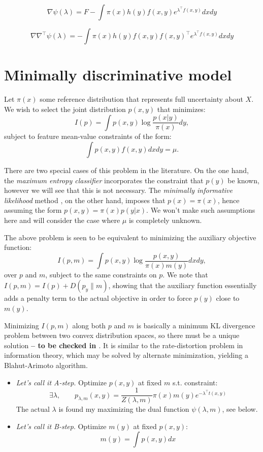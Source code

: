 \documentclass[english]{scrartcl}
\begin{document}
$$
\nabla\psi(\lambda)
= F - \int \pi(x) h(y) f(x,y) e^{\lambda^\top f(x,y)} dx dy
$$

$$
\nabla\nabla^\top\psi(\lambda)
= - \int \pi(x) h(y) f(x,y)f(x,y)^\top e^{\lambda^\top f(x,y)} dx dy
$$


\section{Minimally discriminative model}

Let $\pi(x)$ some reference distribution that represents full
uncertainty about $X$. We wish to select the joint distribution
$p(x,y)$ that minimizes:
$$
I(p) = \int p(x,y) \log \frac{p(x|y)}{\pi(x)} dy,
$$ subject to feature mean-value constraints of the form:
$$
\int p(x,y) f(x,y) dx dy = \mu.
$$

There are two special cases of this problem in the literature.  On the
one hand, the {\em maximum entropy classifier} \cite{BergerA-96}
incorporates the constraint that $p(y)$ be known, however we will see
that this is not necessary. The {\em minimally informative likelihood}
method \cite{Yuan-99b,Yuan-99}, on the other hand, imposes that
$p(x)=\pi(x)$, hence assuming the form $p(x,y)=\pi(x)p(y|x)$. We won't
make such assumptions here and will consider the case where $\mu$ is
completely unknown.

The above problem is seen to be equivalent to minimizing the auxiliary
objective function:
$$
I(p,m) 
= \int p(x,y) \log \frac{p(x,y)}{\pi(x)m(y)} dxdy,
$$ over $p$ and $m$, subject to the same constraints on $p$. We note
that $I(p,m)=I(p)+D(p_y\|m)$, showing that the auxiliary function
essentially adds a penalty term to the actual objective in order to
force $p(y)$ close to $m(y)$.

Minimizing $I(p,m)$ along both $p$ and $m$ is basically a minimum KL
divergence problem between two convex distribution spaces, so there
must be a unique solution {\bf -- to be checked in
  \cite{Cover-91}}. It is similar to the rate-distortion problem in
information theory, which may be solved by alternate minimization,
yielding a Blahut-Arimoto algorithm.
\begin{itemize}
\item {\em Let's call it A-step}. Optimize $p(x,y)$ at fixed $m$
  s.t. constraint:
$$
\exists \lambda, \qquad
p_{\lambda,m}(x,y) = \frac{1}{Z(\lambda, m)} \pi(x) m(y) e^{-\lambda^\top t(x,y)}
$$
The actual $\lambda$ is found my maximizing the dual function
$\psi(\lambda,m)$, see below.
\item {\em Let's call it B-step}. Optimize $m(y)$ at fixed $p(x,y)$:
$$
m(y) = \int p(x,y) dx
$$
\end{itemize}
\end{document}
